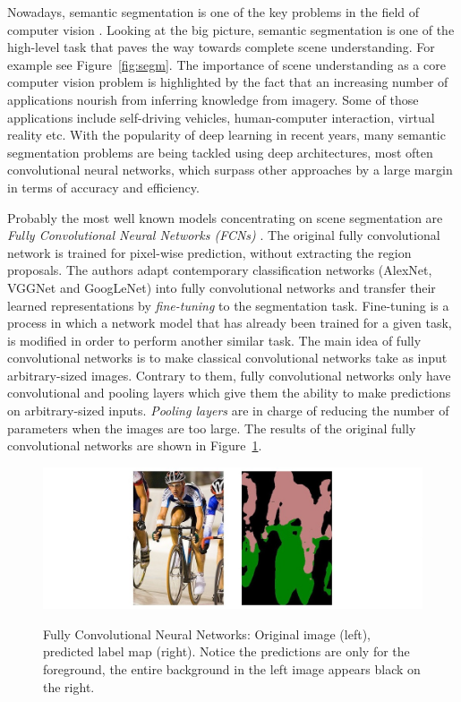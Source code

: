 \documentclass[12pt,a4paper]{report}
\newcommand{\term}{\textit}
\newcommand{\acronym}{\MakeUppercase}
\begin{document}
	Nowadays, semantic segmentation is one of the key problems in the field of computer 
	vision \citep{Le}. Looking at the big picture, semantic segmentation is one of the 
	high-level task that paves the way towards complete scene understanding. For example 
	see Figure~\ref{fig:segm}. The 
	importance of scene understanding as a core computer vision problem is highlighted 
	by the fact that an increasing number of applications nourish from inferring 
	knowledge from imagery. Some of those applications include self-driving vehicles, 
	human-computer interaction, virtual reality etc. With the popularity of deep learning 
	in recent years, many semantic segmentation problems are being tackled using deep 
	architectures, most often convolutional neural networks, which surpass other 
	approaches by a large margin in terms of accuracy and efficiency.
	\par
	Probably the most well known models concentrating on scene segmentation are 
	\term{Fully Convolutional Neural Networks (\acronym{fcn}s)} \citep{Long}. The original 
	fully convolutional network is trained for pixel-wise prediction, without extracting 
	the region proposals. The authors adapt contemporary classification networks (AlexNet,
	VGGNet and GoogLeNet) into fully convolutional networks and transfer their learned 
	representations by \term{fine-tuning} to the segmentation task. Fine-tuning is a 
	process in which a network model that has already been trained for a given task, is 
	modified in order to perform another similar task. The main idea of fully convolutional 
	networks is to make classical convolutional networks take as input arbitrary-sized 
	images. Contrary to them, fully convolutional networks only have convolutional and 
	pooling layers which give them the ability to make predictions on arbitrary-sized inputs. 
	\term{Pooling layers} are in charge of reducing the number of parameters when the images 
	are too large. The results of the original fully convolutional networks are shown in 
	Figure~\ref{fig:fcn}.
	
	\begin{figure}[h!]
		\caption{Fully Convolutional Neural Networks: Original image (left), predicted label 
		map (right). Notice the predictions are only for the foreground, the entire background 
		in the left image appears black on the right.}
		\centering
		\includegraphics[width=\textwidth]{fcn}
		\label{fig:fcn}
	\end{figure}
	
\end{document}

